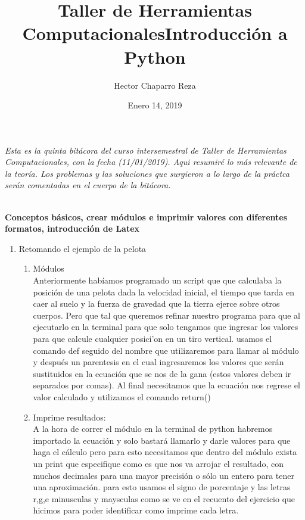 \documentclass[letterpaper, 12pt, oneside]{article}
\title{\Huge{Taller de Herramientas Computacionales}}
\author{Hector Chaparro Reza}
\date{Enero 14, 2019}
\begin{document}
	\maketitle
	\it Esta es la quinta bit\'acora del curso intersemestral de Taller de Herramientas Computacionales, con la fecha (11/01/2019). Aqui resumir\'e lo m\'as relevante de la teor\'ia. Los problemas y las soluciones que surgieron a lo largo de la pr\'actca ser\'an comentadas en el cuerpo de la bit\'acora. 
	\newpage
	
	\title{\Huge{Introducci\'on a Python}}\\
	
	\textbf{Conceptos b\'asicos, crear m\'odulos e imprimir valores con diferentes formatos, introducci\'on de Latex}\\
	
	\begin{enumerate}
		\item {Retomando el ejemplo de la pelota}
		\begin{enumerate}
			\item M\'odulos\\
			Anteriormente hab\'iamos programado un script que que calculaba la posici\'on de una pelota dada la velocidad inicial, el tiempo que tarda en caer al suelo y la fuerza de gravedad que la tierra ejerce sobre otros cuerpos. Pero que tal que queremos refinar nuestro programa para que al ejecutarlo en la terminal para que solo tengamos que ingresar los valores para que calcule cualquier posici'on en un tiro vertical. usamos el comando def seguido del nombre que utilizaremos para llamar al m\'odulo y despu\'es un parentesis en el cual ingresaremos los valores que ser\'an sustituidos en la ecuaci\'on que se nos de la gana (estos valores deben ir separados por comas). Al final necesitamos que la ecuaci\'on nos regrese el valor calculado y utilizamos el comando return()\\
			
			\item Imprime resultados:\\
			A la hora de correr el m\'odulo en la terminal de python habremos importado la ecuaci\'on y solo bastar\'a llamarlo y darle valores para que haga el c\'alculo pero para esto necesitamos que dentro del m\'odulo exista un print que especifique como es que nos va arrojar el resultado, con muchos decimales para una mayor precisi\'on o s\'olo un entero para tener una aproximaci\'on. para esto usamos el signo de porcentaje y las letras r,g,e minusculas y maysculas como se ve en el recuento del ejercicio que hicimos para poder identificar como imprime cada letra. \\
			

\end{enumerate}
\end{enumerate}
\end{document}
